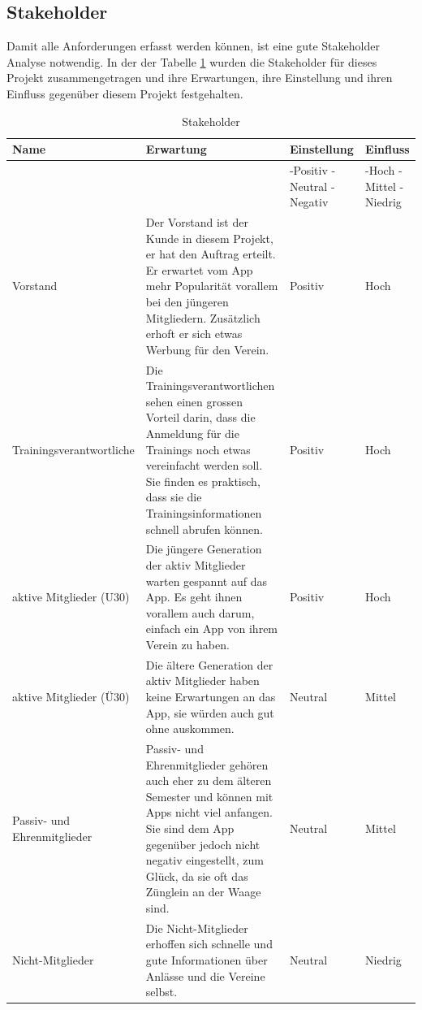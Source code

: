 \newpage
\subsection{Stakeholder}\label{stakeholder}
Damit alle Anforderungen erfasst werden können, ist eine gute Stakeholder Analyse notwendig. In der der Tabelle \ref{table:stakeholder} wurden die Stakeholder für dieses Projekt zusammengetragen und ihre Erwartungen, ihre Einstellung und ihren Einfluss gegenüber diesem Projekt festgehalten.

\begin{table}[ht]
\centering
  \begin{tabular}{ l | p{5cm} | p{1.5cm} | p{1.5cm} }
	\hline
	\rowcolor{darkgray}
	Name							&	Erwartung		&	Einstellung 	&	Einfluss	\\ \hline
	\rowcolor{gray}
								&				&	-Positiv \mbox{-Neutral} \mbox{-Negativ} 	&	-Hoch \mbox{-Mittel} \mbox{-Niedrig} \\ \hline
	Vorstand						&	Der Vorstand ist der Kunde in diesem Projekt, er hat den Auftrag erteilt. Er erwartet vom App mehr Popularität vorallem bei den jüngeren Mitgliedern. Zusätzlich erhoft er sich etwas Werbung für den Verein.			
												& 	Positiv		&	Hoch		\\ \hline
	Trainingsverantwortliche				&	Die Trainingsverantwortlichen sehen einen grossen Vorteil darin, dass die Anmeldung für die Trainings noch etwas vereinfacht werden soll. Sie finden es praktisch, dass sie die Trainingsinformationen schnell abrufen können.			
												& 	Positiv		&	Hoch		\\ \hline
	aktive Mitglieder (U30)				&	Die jüngere Generation der aktiv Mitglieder warten gespannt auf das App. Es geht ihnen vorallem auch darum, einfach ein App von ihrem Verein zu haben.			
												& 	Positiv		&	Hoch		\\ \hline
	aktive Mitglieder (Ü30)				&	Die ältere Generation der aktiv Mitglieder haben keine Erwartungen an das App, sie würden auch gut ohne auskommen. 		
												& 	Neutral	&	Mittel		\\ \hline
	Passiv- und Ehrenmitglieder			&	Passiv- und Ehrenmitglieder gehören auch eher zu dem älteren Semester und können mit Apps nicht viel anfangen. Sie sind dem App gegenüber jedoch nicht negativ eingestellt, zum Glück, da sie oft das Zünglein an der Waage sind.
												& 	Neutral	&	Mittel		\\ \hline
	Nicht-Mitglieder					&	Die Nicht-Mitglieder erhoffen sich schnelle und gute Informationen über Anlässe und die Vereine selbst.
												& 	Neutral	&	Niedrig	\\ \hline
  \end{tabular}
   \caption{Stakeholder}\label{table:stakeholder}
\end{table}

